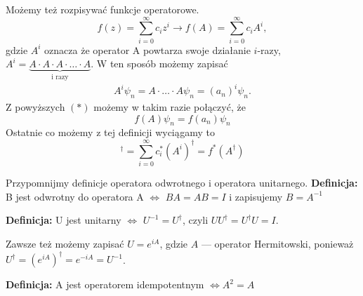 \iffalse
\textbf{Definicja:} Operator sprzężony $A^{\dagger}$ definiujemy następująco
\begin{equation*}
	\langle x | A^{\dagger} | \psi \rangle = \langle (Ax)  | \psi \rangle = \langle \psi | A | x \rangle^{*}
\end{equation*}
\fi

Możemy też rozpisywać funkcje operatorowe.
\begin{equation*}
	f(z) = \sum_{i = 0}^{\infty} c_i z^i \rightarrow f(A) = \sum_{i = 0}^{\infty} c_i A^i,
\end{equation*}
gdzie $A^i$ oznacza że operator A powtarza swoje działanie $i$-razy, $A^i = \underbrace{A \cdot A \cdot A \cdot \dotsc \cdot A}_{\text{i razy}}$.
W ten sposób możemy zapisać
\begin{equation*}
	\begin{split}
		A^i \psi_n = A \cdot \dotsc \cdot A \psi_n = (a_n)^i \psi_n.
	\end{split}
\end{equation*}
Z powyższych $(*)$ możemy w takim razie połączyć, że
\begin{equation*}
	f(A) \psi_n = f(a_n) \psi_n
\end{equation*}
Ostatnie co możemy z tej definicji wyciągamy to
\begin{equation*}
	[f(A)]^{\dagger} = \sum_{i = 0}^{\infty} c_i^* (A^i)^{\dagger} = f^*(A^{\dagger})
\end{equation*}

Przypomnijmy definicje operatora odwrotnego i operatora unitarnego.
\textbf{Definicja:} B jest odwrotny do operatora A $\iff$ $BA = AB = I$ i zapisujemy $B = A^{-1}$

\textbf{Definicja:} U jest unitarny $\iff$ $U^{-1} = U^{\dagger}$, czyli
$U U^{\dagger} = U^{\dagger} U = I$. 

Zawsze też możemy zapisać $U = e^{iA}$, gdzie $A$ --- operator Hermitowski,
ponieważ \newline $U^{\dagger} = (e^{iA})^{\dagger} = e^{-iA} = U^{-1}$.

\textbf{Definicja:} A jest operatorem idempotentnym $\iff A^2 = A$

